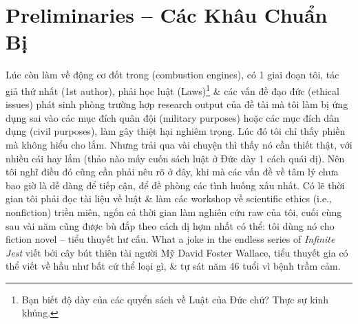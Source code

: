 \documentclass[12pt,oneside]{book}
\begin{document}
\chapter{Preliminaries -- Các Khâu Chuẩn Bị}
\minitoc
Lúc còn làm về động cơ đốt trong (combustion engines), có 1 giai đoạn tôi, tác giả thứ nhất (1st author), phải học luật (Laws)\footnote{Bạn biết độ dày của các quyển sách về Luật của Đức chứ? Thực sự kinh khủng.} \& các vấn đề đạo đức (ethical issues) phát sinh phòng trường hợp research output của đề tài mà tôi làm bị ứng dụng sai vào các mục đích quân đội (military purposes) hoặc các mục đích dân dụng (civil purposes), làm gây thiệt hại nghiêm trọng. Lúc đó tôi chỉ thấy phiền mà không hiểu cho lắm. Nhưng trải qua vài chuyện thì thấy nó cần thiết thật, với nhiều cái hay lắm (thảo nào mấy cuốn sách luật ở Đức dày 1 cách quái dị). Nên tôi nghĩ điều đó cũng cần phải nêu rõ ở đây, khi mà các vấn đề về tâm lý chưa bao giờ là dễ dàng để tiếp cận, để đề phòng các tình huống xấu nhất. Có lẽ thời gian tôi phải đọc tài liệu về luật \& làm các workshop về scientific ethics (i.e., nonfiction) triền miên, ngốn cả thời gian làm nghiên cứu raw của tôi, cuối cùng sau vài năm cũng được bù đắp theo cách dị hợm nhất có thể: tôi dùng nó cho fiction novel -- tiểu thuyết hư cấu. What a joke in the endless series of {\it Infinite Jest} \cite{Wallace_jest} viết bởi cây bút thiên tài người Mỹ {\sc David Foster Wallace}, tiểu thuyết gia có thể viết về hầu như bất cứ thể loại gì, \& tự sát năm 46 tuổi vì bệnh trầm cảm.
\end{document}
